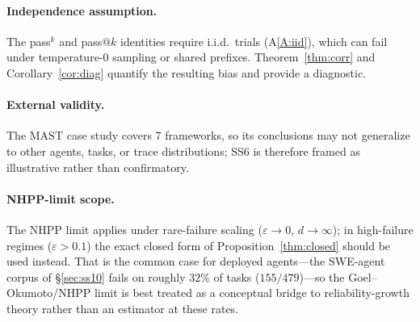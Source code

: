 \paragraph{Independence assumption.}
The pass$^k$ and pass$@k$ identities require i.i.d.\ trials
(A\ref{A:iid}), which can fail under temperature-0 sampling or shared
prefixes. Theorem~\ref{thm:corr} and Corollary~\ref{cor:diag} quantify
the resulting bias and provide a diagnostic.

\paragraph{External validity.}
The MAST case study covers 7 frameworks, so its conclusions may not
generalize to other agents, tasks, or trace distributions; SS6 is
therefore framed as illustrative rather than confirmatory.

\paragraph{NHPP-limit scope.}
The NHPP limit applies under rare-failure scaling
($\varepsilon\to 0$, $d\to\infty$); in high-failure regimes
($\varepsilon > 0.1$) the exact closed form of
Proposition~\ref{thm:closed} should be used instead. That is the common
case for deployed agents---the SWE-agent corpus of \S\ref{sec:ss10}
fails on roughly $32\%$ of tasks ($155/479$)---so the
Goel--Okumoto/NHPP limit is best treated as a conceptual bridge to
reliability-growth theory rather than an estimator at these rates.

